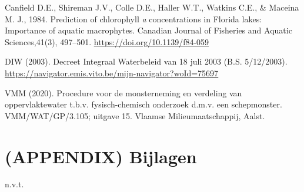 \documentclass[
]{scrreprt}
\begin{document}
Canfield D.E., Shireman J.V., Colle D.E., Haller W.T., Watkins C.E., \& Maceina M. J., 1984. Prediction of chlorophyll \emph{a} concentrations in Florida lakes: Importance of aquatic macrophytes. Canadian Journal of Fisheries and Aquatic Sciences,41(3), 497--501. \url{https://doi.org/10.1139/f84-059}

DIW (2003). Decreet Integraal Waterbeleid van 18 juli 2003 (B.S. 5/12/2003). \href{https://navigator.emis.vito.be/mijn-navigator?woId=75697}{\ul{https://navigator.emis.vito.be/mijn-navigator?woId=75697}}

VMM (2020). Procedure voor de monsterneming en verdeling van oppervlaktewater t.b.v. fysisch-chemisch onderzoek d.m.v. een schepmonster. VMM/WAT/GP/3.105; uitgave 15. Vlaamse Milieumaatschappij, Aalst.

\chapter{(APPENDIX) Bijlagen}\label{appendix-bijlagen}

n.v.t.
\end{document}
